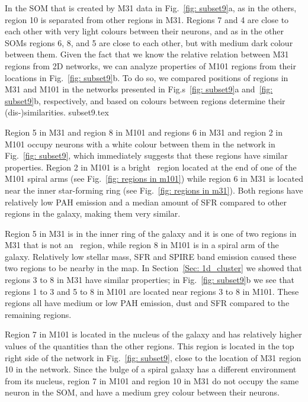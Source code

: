     In the SOM that is created by M31 data in Fig.~\ref{fig: subset9}a, as in the others, region 10 is separated from other regions in M31.
    Regions 7 and 4 are close to each other with very light colours between their neurons, and as in the other SOMs regions 6, 8, and 5 are close to each other, but with medium dark colour between them.
    Given the fact that we know the relative relation between M31 regions from 2D networks, we can analyze properties of M101 regions from their locations in Fig.~\ref{fig: subset9}b.
    To do so, we compared positions of regions in M31 and M101 in the networks presented in Fig.s~\ref{fig: subset9}a and~\ref{fig: subset9}b, respectively, and based on colours between regions determine their (dis-)similarities.
    {subset9.tex}
    
    Region 5 in M31 and region 8 in M101 and regions 6 in M31 and region 2 in M101 occupy neurons with a white colour between them in the network in Fig.~\ref{fig: subset9}, which immediately suggests that these regions have similar properties. 
    Region 2 in M101 is a bright \hii~region located at the end of  one of the M101 spiral arms (see Fig.~\ref{fig: regions in m101}) while
    region 6 in M31 is located near the inner star-forming ring (see Fig.~\ref{fig: regions in m31}).
    Both regions have relatively low PAH emission and a median amount of  SFR compared to other regions in the galaxy, making them very similar.
    
    Region 5 in M31 is in the inner ring of the galaxy and it is one of two regions in M31 that is not an  \hii~region, while
    region 8 in M101 is in a spiral arm of the galaxy.
    Relatively low stellar mass, SFR and SPIRE band emission caused these two regions to be nearby in the map.
    In Section~\ref{Sec: 1d_cluster} we showed that regions 3 to 8 in M31 have similar properties; in Fig.~\ref{fig: subset9}b we see that regions 1 to 3 and 5 to 8 in M101 are located near regions 3 to 8 in M101. 
    These regions all have medium or low PAH emission, dust and SFR compared to the remaining regions.
    
    Region 7 in M101 is located in the nucleus of the galaxy and has relatively higher values of the quantities than the other regions.
    This region is located in the top right side of the network in Fig.~\ref{fig: subset9}, close to the location of M31 region 10 in the network.
    Since the bulge of a spiral galaxy has a different environment from its nucleus, region 7 in M101 and region 10 in M31 do not occupy the same neuron in the SOM, and have a medium grey colour between their neurons.

